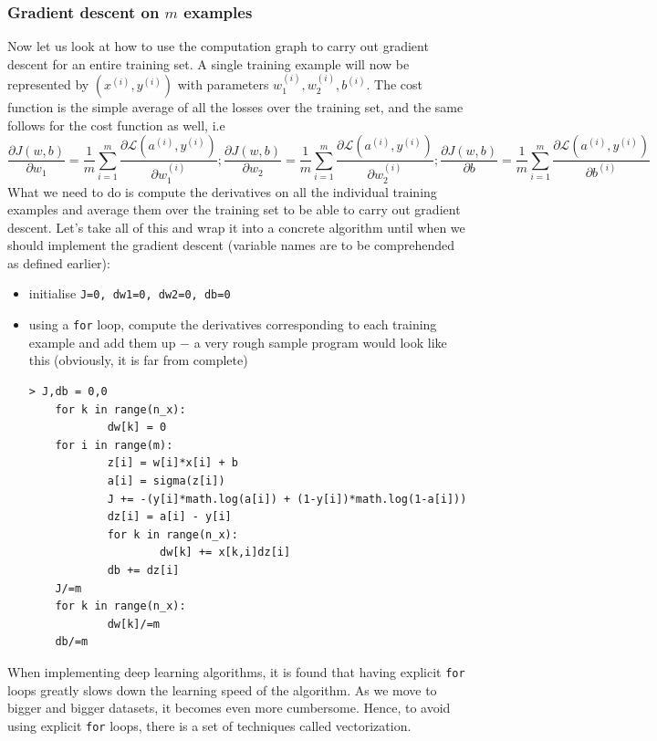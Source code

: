\documentclass{article}[a4paper,12pt]
\theoremstyle{definition}
\newcommand{\Lagr}{\mathcal{L}}
\begin{document}
\subsubsection{Gradient descent on $m$ examples}
Now let us look at how to use the computation graph to carry out gradient descent for an entire training set. A single training example will now be represented by $(x^{(i)},y^{(i)})$ with parameters $w_1^{(i)},w_2^{(i)},b^{(i)}$. The cost function is the simple average of all the losses over the training set, and the same follows for the cost function as well, i.e
$$\frac{\partial J(w,b)}{\partial w_1}=\frac{1}{m}\sum_{i=1}^m\frac{\partial\Lagr(a^{(i)},y^{(i)})}{\partial w_1^{(i)}};\frac{\partial J(w,b)}{\partial w_2}=\frac{1}{m}\sum_{i=1}^m\frac{\partial\Lagr(a^{(i)},y^{(i)})}{\partial w_2^{(i)}};\frac{\partial J(w,b)}{\partial b}=\frac{1}{m}\sum_{i=1}^m\frac{\partial\Lagr(a^{(i)},y^{(i)})}{\partial b^{(i)}}$$
What we need to do is compute the derivatives on all the individual training examples and average them over the training set to be able to carry out gradient descent. Let's take all of this and wrap it into a concrete algorithm until when we should implement the gradient descent (variable names are to be comprehended as defined earlier):
\begin{itemize}
	\item initialise \texttt{J=0, dw1=0, dw2=0, db=0}
	\item using a \texttt{for} loop, compute the derivatives corresponding to each training example and add them up $-$ a very rough sample program would look like this (obviously, it is far from complete)
\begin{Verbatim}[tabsize=2]
> J,db = 0,0
	for k in range(n_x):
			dw[k] = 0
	for i in range(m):
			z[i] = w[i]*x[i] + b
			a[i] = sigma(z[i])
			J += -(y[i]*math.log(a[i]) + (1-y[i])*math.log(1-a[i]))
			dz[i] = a[i] - y[i]
			for k in range(n_x):
					dw[k] += x[k,i]dz[i]
			db += dz[i]
	J/=m
	for k in range(n_x):
			dw[k]/=m
	db/=m
\end{Verbatim}
\end{itemize}
When implementing deep learning algorithms, it is found that having explicit \texttt{for} loops greatly slows down the learning speed of the algorithm. As we move to bigger and bigger datasets, it becomes even more cumbersome. Hence, to avoid using explicit \texttt{for} loops, there is a set of techniques called vectorization. 
\end{document}
